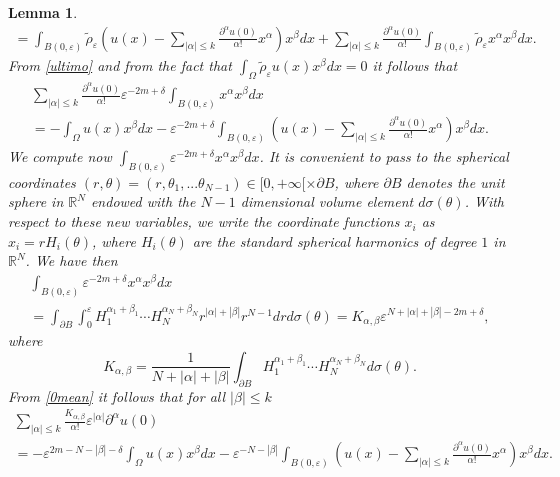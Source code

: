 \documentclass[11pt,a4paper]{amsart}
\numberwithin{equation}{section}
\newtheorem{lemma}[equation]{Lemma}
\begin{document}
\begin{lemma}
\begin{multline}
=\int_{B(0,\varepsilon)}\tilde\rho_{\varepsilon}\left(u(x)-\sum_{|\alpha|\leq k}\frac{\partial^{\alpha}u(0)}{\alpha !}x^{\alpha}\right) x^{\beta}dx+\sum_{|\alpha|\leq k}\frac{\partial^{\alpha}u(0)}{\alpha !}\int_{B(0,\varepsilon)}\tilde\rho_{\varepsilon}x^{\alpha} x^{\beta}dx.
\end{multline}
From \eqref{ultimo} and from the fact that $\int_{\Omega}\tilde\rho_{\varepsilon} u(x) x^{\beta} dx=0$ it follows that
\begin{multline}\label{0mean} 
\sum_{|\alpha|\leq k}\frac{\partial^{\alpha}u(0)}{\alpha !}\varepsilon^{-2m+\delta}\int_{B(0,\varepsilon)}x^{\alpha} x^{\beta}dx\\
=-\int_{\Omega}u(x)x^{\beta}dx-\varepsilon^{-2m+\delta}\int_{B(0,\varepsilon)}\left(u(x)-\sum_{|\alpha|\leq k}\frac{\partial^{\alpha}u(0)}{\alpha !}x^{\alpha}\right) x^{\beta}dx.
\end{multline}
We compute now $\int_{B(0,\varepsilon)}\varepsilon^{-2m+\delta}x^{\alpha}x^{\beta}dx$. It is convenient to pass to the spherical coordinates $(r,\theta)=(r,\theta_1,...\theta_{N-1})\in[0,+\infty[\times\partial B$, where $\partial B$ denotes the unit sphere in $\mathbb R^N$ endowed with the $N-1$ dimensional volume element $d\sigma(\theta)$. With respect to these  new variables, we write the coordinate functions $x_i$ as $x_i=r H_i(\theta)$, where $H_i(\theta)$ are the standard spherical harmonics of degree $1$ in $\mathbb R^N$. We have then
\begin{multline*}
\int_{B(0,\varepsilon)}\varepsilon^{-2m+\delta}x^{\alpha}x^{\beta}dx\\
=\int_{\partial B}\int_0^{\varepsilon}H_1^{\alpha_1+\beta_1}\cdots H_N^{\alpha_N+\beta_N}r^{|\alpha|+|\beta|}r^{N-1}drd\sigma(\theta)=K_{\alpha,\beta}\varepsilon^{N+|\alpha|+|\beta|-2m+\delta},
\end{multline*}
where
\begin{equation}\label{Kab}
K_{\alpha,\beta}=\frac{1}{N+|\alpha|+|\beta|}\int_{\partial B}H_1^{\alpha_1+\beta_1}\cdots H_N^{\alpha_N+\beta_N}d\sigma(\theta).
\end{equation}
From \eqref{0mean} it follows that for all $|\beta|\leq k$
\begin{multline}\label{der-system}
\sum_{|\alpha|\leq k}\frac{K_{\alpha,\beta}}{\alpha !}\varepsilon^{|\alpha|}\partial^{\alpha}u(0)\\
=-\varepsilon^{2m-N-|\beta|-\delta}\int_{\Omega}u(x)x^{\beta}dx-\varepsilon^{-N-|\beta|}\int_{B(0,\varepsilon)}\left(u(x)-\sum_{|\alpha|\leq k}\frac{\partial^{\alpha}u(0)}{\alpha !}x^{\alpha}\right)x^{\beta}dx.

\end{multline}
\end{lemma}
\end{document}

